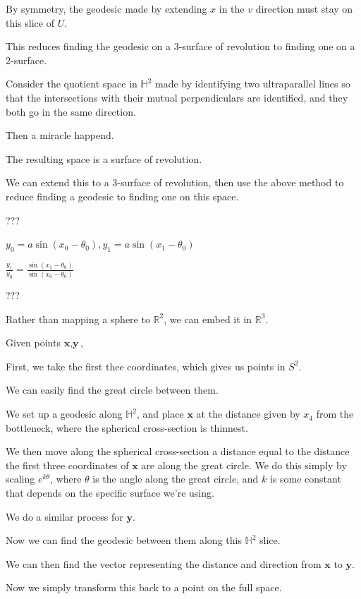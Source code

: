 \documentclass[12pt]{amsart}
\begin{document}
By symmetry, the geodesic made by extending $x$ in the $v$ direction must stay on this slice of $U$.

This reduces finding the geodesic on a $3$-surface of revolution to finding one on a $2$-surface.

Consider the quotient space in $\mathbb{H}^2$ made by identifying two ultraparallel lines so that the intersections with their mutual perpendiculars are identified, and they both go in the same direction.

Then a miracle happend.

The resulting space is a surface of revolution.

We can extend this to a $3$-surface of revolution, then use the above method to reduce finding a geodesic to finding one on this space.

???

$y_0 = a\sin(x_0-\theta_0), y_1 = a\sin(x_1-\theta_0)$

$\frac{y_1}{y_0} = \frac{\sin(x_1-\theta_0)}{\sin(x_0-\theta_0)}$

???

Rather than mapping a sphere to $\mathbb{R}^2$, we can embed it in $\mathbb{R}^3$.

Given points $\textbf{x}, \textbf{y}$,

First, we take the first thee coordinates, which gives us points in $S^2$.

We can easily find the great circle between them.

We set up a geodesic along $\mathbb{H}^2$, and place $\textbf{x}$ at the distance given by $x_4$ from the bottleneck, where the spherical cross-section is thinnest.

We then move along the spherical cross-section a distance equal to the distance the first three coordinates of $\textbf{x}$ are along the great circle. We do this simply by scaling $e^{k\theta}$, where $\theta$ is the angle along the great circle, and $k$ is some constant that depends on the specific surface we're using.


We do a similar process for $\textbf{y}$.

Now we can find the geodesic between them along this $\mathbb{H}^2$ slice.

We can then find the vector representing the distance and direction from $\textbf{x}$ to $\textbf{y}$.

Now we simply transform this back to a point on the full space.
\end{document}
